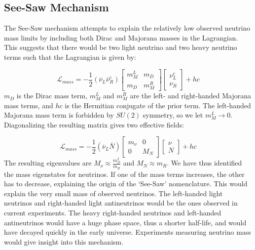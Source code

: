 \subsection{See-Saw Mechanism}
The See-Saw mechanism attempts to explain the relatively low observed neutrino mass limits by including both Dirac and Majorana masses in the Lagrangian. This suggests that there would be two light neutrino and two heavy neutrino terms such that the Lagrangian is given by:

\begin{equation}\label{mass_lagrangian}
\mathcal{L}_{mass} = -\frac{1}{2}(\bar{\nu}_L\bar{\nu}_R^c) \begin{bmatrix} m_M^L & m_D \\ m_D & m_M^R \end{bmatrix} \begin{bmatrix} \nu_L^c \\ \nu_R \end{bmatrix} + hc
\end{equation}
\noindent
$m_D$ is the Dirac mass term, $m_M^L$ and $m_M^R$ are the left- and right-handed Majorana mass terms, and $hc$ is the Hermitian conjugate of the prior term. The left-handed Majorana mass term is forbidden by $SU (2)$ symmetry, so we let $m_M^L \rightarrow 0$. Diagonalizing the resulting matrix gives two effective fields: 

\begin{equation}\label{mass_lagrangian_reduced}
\mathcal{L}_{mass} = -\frac{1}{2}(\bar{\nu}_L\bar{N}) \begin{bmatrix} m_\nu & 0 \\ 0 & M_N \end{bmatrix} \begin{bmatrix} \nu \\ N \end{bmatrix} + hc
\end{equation}
\noindent
The resulting eigenvalues are $M_\nu \approx \frac{m^2_D}{m_R}$ and $M_N \approx m_R$. We have thus identified the mass eigenstates for neutrinos. If one of the mass terms increases, the other has to decrease, explaining the origin of the `See-Saw' nomenclature. This would explain the very small mass of observed neutrinos. The left-handed light neutrinos and right-handed light antineutrinos would be the ones observed in current experiments. The heavy right-handed neutrinos and left-handed antineutrinos would have a huge phase space, thus a shorter half-life, and would have decayed quickly in the early universe. Experiments measuring neutrino mass would give insight into this mechanism. 


